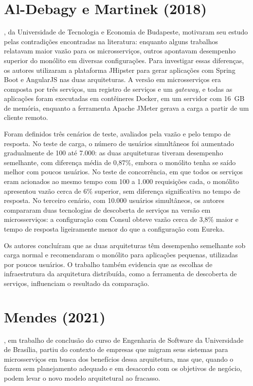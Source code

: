 \section{Al-Debagy e Martinek (2018)}

, da Universidade de Tecnologia e Economia de Budapeste, motivaram seu
estudo pelas contradições encontradas na literatura: enquanto alguns trabalhos relatavam maior
vazão para os microsserviços, outros apontavam desempenho superior do monólito em diversas
configurações. Para investigar essas diferenças, os autores utilizaram a plataforma JHipster
para gerar aplicações com Spring Boot e AngularJS nas duas arquiteturas. A versão em
microsserviços era composta por três serviços, um registro de serviços e um
\textit{gateway}, e todas as aplicações foram executadas em contêineres Docker, em um servidor
com 16~GB de memória, enquanto a ferramenta Apache JMeter gerava a carga a partir de um cliente
remoto.

Foram definidos três cenários de teste, avaliados pela vazão e pelo tempo de resposta. No teste
de carga, o número de usuários simultâneos foi aumentado gradualmente de 100 até 7.000: as duas
arquiteturas tiveram desempenho semelhante, com diferença média de 0,87\%, embora o monólito
tenha se saído melhor com poucos usuários. No teste de concorrência, em que todos os serviços
eram acionados ao mesmo tempo com 100 a 1.000 requisições cada, o monólito apresentou vazão
cerca de 6\% superior, sem diferença significativa no tempo de resposta. No terceiro cenário,
com 10.000 usuários simultâneos, os autores compararam duas tecnologias de descoberta de
serviços na versão em microsserviços: a configuração com Consul obteve vazão cerca de 3,8\%
maior e tempo de resposta ligeiramente menor do que a configuração com Eureka.

Os autores concluíram que as duas arquiteturas têm desempenho semelhante sob carga normal e
recomendaram o monólito para aplicações pequenas, utilizadas por poucos usuários. O trabalho
também evidencia que as escolhas de infraestrutura da arquitetura distribuída, como a
ferramenta de descoberta de serviços, influenciam o resultado da comparação.

\section{Mendes (2021)}

, em trabalho de conclusão do curso de Engenharia de Software da
Universidade de Brasília, partiu do contexto de empresas que migram seus sistemas para
microsserviços em busca dos benefícios dessa arquitetura, mas que, quando o fazem sem
planejamento adequado e em desacordo com os objetivos de negócio, podem levar o novo modelo
arquitetural ao fracasso.

